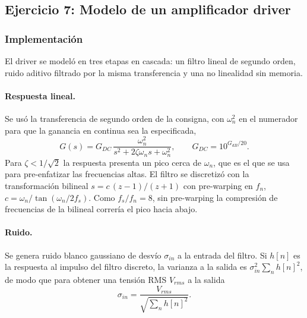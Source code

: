 \subsection*{Ejercicio 7: Modelo de un amplificador driver}

\subsubsection*{Implementación}

El driver se modeló en tres etapas en cascada: un filtro lineal de segundo
orden, ruido aditivo filtrado por la misma transferencia y una no
linealidad sin memoria.

\paragraph{Respuesta lineal.}
Se usó la transferencia de segundo orden de la consigna, con $\omega_n^2$
en el numerador para que la ganancia en continua sea la especificada,
%
\begin{equation}
G(s) = G_{DC}\,\frac{\omega_n^2}{s^2 + 2\zeta\omega_n s + \omega_n^2},
\qquad G_{DC} = 10^{G_{dB}/20}.
\label{eq:ej7_G}
\end{equation}
%
Para $\zeta < 1/\sqrt{2}$ la respuesta presenta un pico cerca de
$\omega_n$, que es el que se usa para pre-enfatizar las frecuencias altas.
El filtro se discretizó con la transformación bilineal
$s = c\,(z-1)/(z+1)$ con pre-warping en $f_n$,
$c = \omega_n/\tan(\omega_n/2f_s)$. Como $f_s/f_n = 8$, sin pre-warping la
compresión de frecuencias de la bilineal correría el pico hacia abajo.

\paragraph{Ruido.}
Se genera ruido blanco gaussiano de desvío $\sigma_{in}$ a la entrada del
filtro. Si $h[n]$ es la respuesta al impulso del filtro discreto, la
varianza a la salida es $\sigma_{in}^2\sum_n h[n]^2$, de modo que para
obtener una tensión RMS $V_{rms}$ a la salida
%
\begin{equation}
\sigma_{in} = \frac{V_{rms}}{\sqrt{\sum_n h[n]^2}}.
\end{equation}

